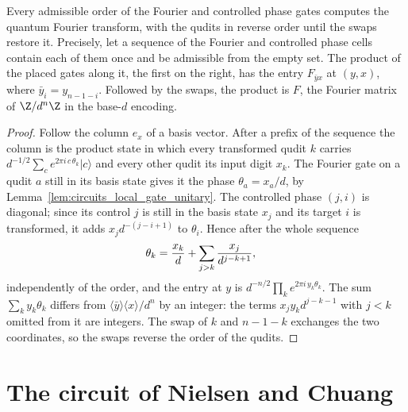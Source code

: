 \begin{theorem}
    \label{thm:qft_order}
    \leanok
    Every admissible order of the Fourier and controlled phase gates computes the quantum
    Fourier transform, with the qudits in reverse order until the swaps restore it.
    Precisely, let a sequence of the Fourier and controlled phase cells contain each of
    them once and be admissible from the empty set. The product of the placed gates along it, the
    first on the right, has the entry $F_{\bar yx}$ at $(y,x)$, where
    $\bar y_i=y_{n-1-i}$. Followed by the swaps, the product is $F$, the Fourier matrix of
    $\Z/d^n\Z$ in the base-$d$ encoding.
\end{theorem}
\begin{proof}\leanok
    Follow the column $e_x$ of a basis vector. After a prefix of the sequence the
    column is the product state in which every transformed qudit $k$ carries
    $d^{-1/2}\sum_ce^{2\pi i\,c\,\theta_k}\lvert c\rangle$ and every other qudit its
    input digit $x_k$. The Fourier gate on a qudit $a$ still in its basis state gives
    it the phase $\theta_a=x_a/d$, by Lemma~\ref{lem:circuits_local_gate_unitary}. The
    controlled phase $(j,i)$ is diagonal; since its control $j$ is still in the basis
    state $x_j$ and its target $i$ is transformed, it adds $x_jd^{-(j-i+1)}$ to
    $\theta_i$. Hence after the whole sequence
    \begin{align}
        \theta_k&=\frac{x_k}d+\sum_{j>k}\frac{x_j}{d^{j-k+1}},
        \notag
    \end{align}
    independently of the order, and the entry at $y$ is
    $d^{-n/2}\prod_ke^{2\pi i\,y_k\theta_k}$. The sum $\sum_ky_k\theta_k$ differs from
    $\langle\bar y\rangle\langle x\rangle/d^n$ by an integer: the terms
    $x_jy_kd^{j-k-1}$ with $j<k$ omitted from it are integers. The swap of $k$ and
    $n-1-k$ exchanges the two coordinates, so the swaps reverse the order of the
    qudits.
\end{proof}

\section{The circuit of Nielsen and Chuang}
\label{sec:qft_circuit}

